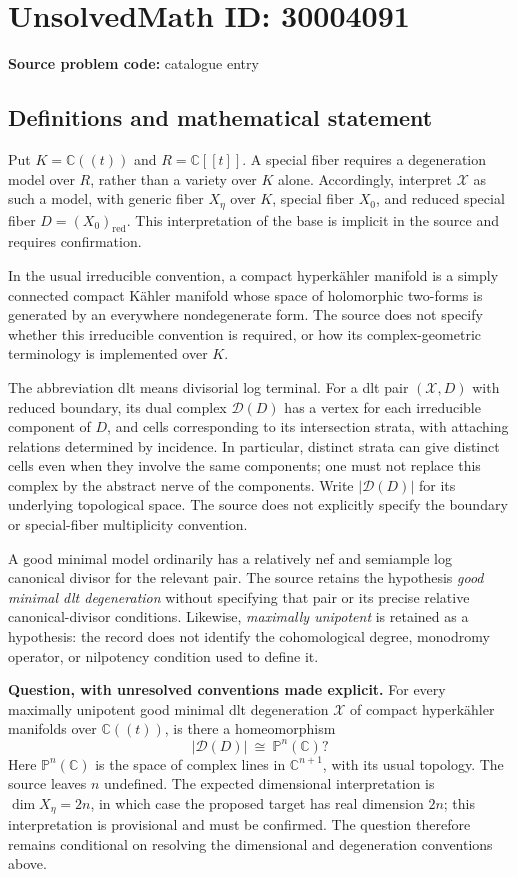 \documentclass[11pt]{article}
\newcommand{\C}{\mathbb{C}}
\newcommand{\PP}{\mathbb{P}}
\begin{document}
\section*{UnsolvedMath ID: 30004091}
\textbf{Source problem code:} catalogue entry
\subsection{Definitions and mathematical statement}
Put \(K=\C((t))\) and \(R=\C[[t]]\). A special fiber requires a degeneration model over \(R\), rather than a variety over \(K\) alone. Accordingly, interpret \(\mathcal X\) as such a model, with generic fiber \(X_\eta\) over \(K\), special fiber \(X_0\), and reduced special fiber \(D=(X_0)_{\mathrm{red}}\). This interpretation of the base is implicit in the source and requires confirmation.

In the usual irreducible convention, a compact hyperkähler manifold is a simply connected compact Kähler manifold whose space of holomorphic two-forms is generated by an everywhere nondegenerate form. The source does not specify whether this irreducible convention is required, or how its complex-geometric terminology is implemented over \(K\).

The abbreviation dlt means divisorial log terminal. For a dlt pair \((\mathcal X,D)\) with reduced boundary, its dual complex \(\mathcal D(D)\) has a vertex for each irreducible component of \(D\), and cells corresponding to its intersection strata, with attaching relations determined by incidence. In particular, distinct strata can give distinct cells even when they involve the same components; one must not replace this complex by the abstract nerve of the components. Write \(\lvert\mathcal D(D)\rvert\) for its underlying topological space. The source does not explicitly specify the boundary or special-fiber multiplicity convention.

A good minimal model ordinarily has a relatively nef and semiample log canonical divisor for the relevant pair. The source retains the hypothesis \emph{good minimal dlt degeneration} without specifying that pair or its precise relative canonical-divisor conditions. Likewise, \emph{maximally unipotent} is retained as a hypothesis: the record does not identify the cohomological degree, monodromy operator, or nilpotency condition used to define it.

\textbf{Question, with unresolved conventions made explicit.} For every maximally unipotent good minimal dlt degeneration \(\mathcal X\) of compact hyperkähler manifolds over \(\C((t))\), is there a homeomorphism
\[
\lvert\mathcal D(D)\rvert\ \cong\ \PP^n(\C)?
\]
Here \(\PP^n(\C)\) is the space of complex lines in \(\C^{n+1}\), with its usual topology. The source leaves \(n\) undefined. The expected dimensional interpretation is \(\dim X_\eta=2n\), in which case the proposed target has real dimension \(2n\); this interpretation is provisional and must be confirmed. The question therefore remains conditional on resolving the dimensional and degeneration conventions above.
\end{document}
